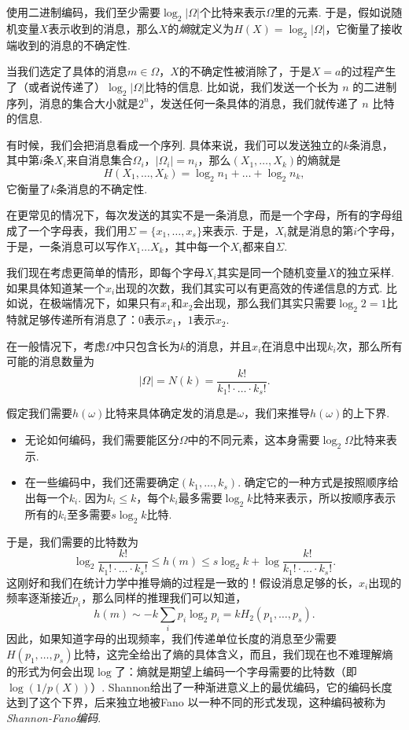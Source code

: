 使用二进制编码，我们至少需要$\log_2 |\Omega|$个比特来表示$\Omega$里的元素. 于是，假如说随机变量$X$表示收到的消息，那么$X$的\textit{熵}就定义为$H(X)=\log_2 |\Omega|$，它衡量了接收端收到的消息的不确定性. 

当我们选定了具体的消息$m\in \Omega$，$X$的不确定性被消除了，于是$X=a$的过程产生了（或者说传递了）$\log_2 |\Omega|$比特的信息. 比如说，我们发送一个长为 $n$ 的二进制序列，消息的集合大小就是$2^n$，发送任何一条具体的消息，我们就传递了 $n$ 比特的信息.

有时候，我们会把消息看成一个序列. 具体来说，我们可以发送独立的$k$条消息，其中第$i$条$X_i$来自消息集合$\Omega_i$，$|\Omega_i|=n_i$，那么$(X_1,\dots,X_k)$的熵就是
\[H(X_1,\dots,X_k)=\log_2 n_1+\dots+\log_2 n_k,\]
它衡量了$k$条消息的不确定性. 

在更常见的情况下，每次发送的其实不是一条消息，而是一个字母，所有的字母组成了一个字母表，我们用$\Sigma=\{x_1,\dots,x_s\}$来表示. 于是，$X_i$就是消息的第$i$个字母，于是，一条消息可以写作$X_1\dots X_k$，其中每一个$X_i$都来自$\Sigma$.

我们现在考虑更简单的情形，即每个字母$X_i$其实是同一个随机变量$X$的独立采样. 如果具体知道某一个$x_i$出现的次数，我们其实可以有更高效的传递信息的方式. 比如说，在极端情况下，如果只有$x_1$和$x_2$会出现，那么我们其实只需要$\log_2 2=1$比特就足够传递所有消息了：$0$表示$x_1$，$1$表示$x_2$.

在一般情况下，考虑$\Omega$中只包含长为$k$的消息，并且$x_i$在消息中出现$k_i$次，那么所有可能的消息数量为
\[|\Omega|=N(k)=\frac{k!}{k_1!\cdot\dots\cdot k_s!}.\]

假定我们需要$h(\omega)$比特来具体确定发的消息是$\omega$，我们来推导$h(\omega)$的上下界. 
\begin{itemize}
    \item 无论如何编码，我们需要能区分$\Omega$中的不同元素，这本身需要$\log_2\Omega$比特来表示. 
    \item 在一些编码中，我们还需要确定$(k_1,\dots,k_s)$. 确定它的一种方式是按照顺序给出每一个$k_i$. 因为$k_i\leq k$，每个$k_i$最多需要$\log_2 k$比特来表示，所以按顺序表示所有的$k_i$至多需要$s\log_2 k$比特.
\end{itemize}
于是，我们需要的比特数为
\[\log_2\frac{k!}{k_1!\cdot\dots\cdot k_s!}\leq h(m)\leq s\log_2k+\log\frac{k!}{k_1!\cdot\dots\cdot k_s!}.\]
这刚好和我们在统计力学中推导熵的过程是一致的！假设消息足够的长，$x_i$出现的频率逐渐接近$p_i$，那么同样的推理我们可以知道，
\[h(m)\sim -k\sum_i p_i\log_2 p_i=kH_2(p_1,\dots,p_s).\]
因此，如果知道字母的出现频率，我们传递单位长度的消息至少需要$H(p_1,\dots,p_s)$比特，这完全给出了熵的具体含义，而且，我们现在也不难理解熵的形式为何会出现$\log$了：熵就是期望上编码一个字母需要的比特数（即$\log(1/p(X))$）. Shannon给出了一种渐进意义上的最优编码，它的编码长度达到了这个下界，后来独立地被Fano \cite{robertm.fanoTransmissionInformation1949} 以一种不同的形式发现，这种编码被称为\textit{Shannon-Fano编码}.

